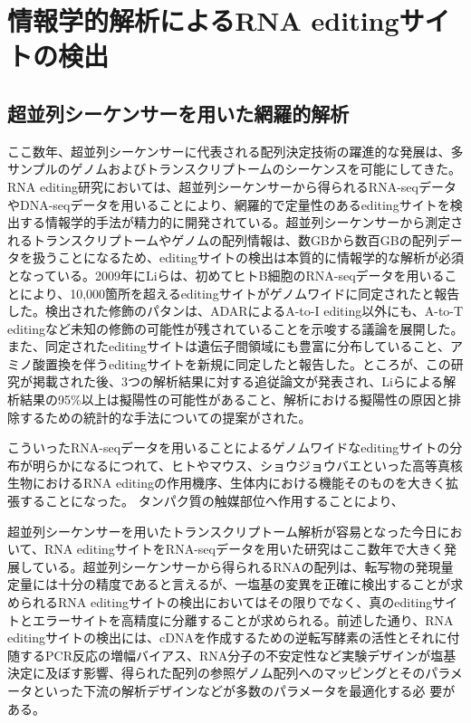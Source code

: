 \section{情報学的解析によるRNA editingサイトの検出}
\subsection{超並列シーケンサーを用いた網羅的解析}
ここ数年、超並列シーケンサーに代表される配列決定技術の躍進的な発展は、多サンプルのゲノムおよびトランスクリプトームのシーケンスを可能にしてきた。RNA editing研究においては、超並列シーケンサーから得られるRNA-seqデータやDNA-seqデータを用いることにより、網羅的で定量性のあるeditingサイトを検出する情報学的手法が精力的に開発されている。超並列シーケンサーから測定されるトランスクリプトームやゲノムの配列情報は、数GBから数百GBの配列データを扱うことになるため、editingサイトの検出は本質的に情報学的な解析が必須となっている。2009年にLiらは、初めてヒトB細胞のRNA-seqデータを用いることにより、10,000箇所を超えるeditingサイトがゲノムワイドに同定されたと報告した。検出された修飾のパタンは、ADARによるA-to-I editing以外にも、A-to-T editingなど未知の修飾の可能性が残されていることを示唆する議論を展開した。また、同定されたeditingサイトは遺伝子間領域にも豊富に分布していること、アミノ酸置換を伴うeditingサイトを新規に同定したと報告した。ところが、この研究が掲載された後、3つの解析結果に対する追従論文が発表され、Liらによる解析結果の95\%以上は擬陽性の可能性があること、解析における擬陽性の原因と排除するための統計的な手法についての提案がされた。

こういったRNA-seqデータを用いることによるゲノムワイドなeditingサイトの分布が明らかになるにつれて、ヒトやマウス、ショウジョウバエといった高等真核生物におけるRNA editingの作用機序、生体内における機能そのものを大きく拡張することになった。
タンパク質の触媒部位へ作用することにより、
\par
超並列シーケンサーを用いたトランスクリプトーム解析が容易となった今日において、RNA editingサイトをRNA-seqデータを用いた研究はここ数年で大きく発展している。超並列シーケンサーから得られるRNAの配列は、転写物の発現量定量には十分の精度であると言えるが、一塩基の変異を正確に検出することが求められるRNA editingサイトの検出においてはその限りでなく、真のeditingサイトとエラーサイトを高精度に分離することが求められる。前述した通り、RNA editingサイトの検出には、cDNAを作成するための逆転写酵素の活性とそれに付随するPCR反応の増幅バイアス、RNA分子の不安定性など実験デザインが塩基決定に及ぼす影響、得られた配列の参照ゲノム配列へのマッピングとそのパラメータといった下流の解析デザインなどが多数のパラメータを最適化する必
要がある。

